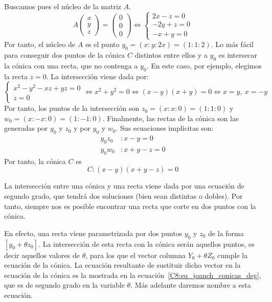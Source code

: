 \begin{exa}
	Buscamos pues el núcleo de la matriz $A$.
	\begin{equation}
	A\left( \begin{array}{c}
	x\\y\\z
	\end{array}\right) =\left( \begin{array}{c}
	0\\0\\0
	\end{array}\right)\Leftrightarrow
	\begin{cases}
	2x-z=0\\
	-2y+z=0\\
	-x+y=0
	\end{cases}
	\end{equation}
	Por tanto, el núcleo de $A$ es el punto $y_0=(x:y:2x)=(1:1:2)$. Lo más fácil para conseguir dos puntos de la cónica $C$ distintos entre ellos y a $y_0$ es intersecar la cónica con una recta, que no contenga a $y_0$. En este caso, por ejemplo, elegimos la recta $z=0$. La intersección viene dada por:
	\begin{equation}
	\begin{cases}
	x^2-y^2-xz+yz=0\\
	z=0
	\end{cases}\Leftrightarrow x^2+y^2=0\Leftrightarrow (x-y)(x+y)=0\Leftrightarrow x=y, \ x=-y
	\end{equation}
	Por tanto, los puntos de la intersección son $z_0=(x:x:0)=(1:1:0)$ y $w_0=(x:-x:0)=(1:-1:0)$. Finalmente, las rectas de la cónica son las generadas por $y_0$ y $z_0$ y por $y_0$ y $w_0$. Sus ecuaciones implícitas son:
	\begin{equation}
	\begin{split}
	y_0z_0&:x-y=0\\
	y_0w_0&:x+y-z=0
	\end{split}
	\end{equation}
	Por tanto, la cónica $C$ es
	\begin{equation}
	C: (x-y)(x+y-z)=0
	\end{equation}
\end{exa}
\begin{obs}
	 La intersección entre una cónica y una recta viene dada por una ecuación de segundo grado, que tendrá dos soluciones (bien sean distintas o dobles). Por tanto, siempre nos es posible encontrar una recta que corte en dos puntos con la cónica.
	 
	 En efecto, una recta viene parametrizada por dos puntos $y_0$ y $z_0$ de la forma $[y_0+\theta z_0]$. La intersección de esta recta con la cónica serán aquellos puntos, es decir aquellos valores de $\theta$, para los que el vector columna $Y_0+\theta Z_0$ cumple la ecuación de la cónica. La ecuación resultante de sustituir dicho vector en la ecuación de la cónica es la mostrada en la ecuación~\eqref{C8:eq_joanch_conicas_deg}, que es de segundo grado en la variable $\theta$. Más adelante daremos nombre a esta ecuación.
\end{obs}

